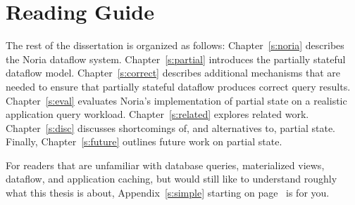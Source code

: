 \section{Reading Guide}

The rest of the dissertation is organized as follows: Chapter~\ref{s:noria}
describes the Noria dataflow system. Chapter~\ref{s:partial} introduces the
partially stateful dataflow model. Chapter~\ref{s:correct} describes additional
mechanisms that are needed to ensure that partially stateful dataflow produces
correct query results. Chapter~\ref{s:eval} evaluates Noria's implementation of
partial state on a realistic application query workload. Chapter~\ref{s:related}
explores related work. Chapter~\ref{s:disc} discusses shortcomings of, and
alternatives to, partial state. Finally, Chapter~\ref{s:future} outlines future
work on partial state.

For readers that are unfamiliar with database queries, materialized views,
dataflow, and application caching, but would still like to understand roughly
what this thesis is about, Appendix~\ref{s:simple} starting on
page~\pageref{s:simple} is for you.
